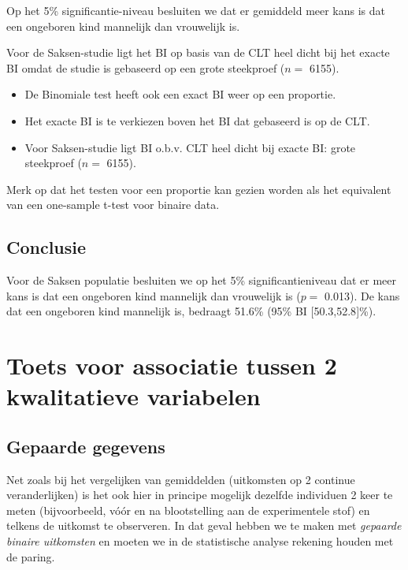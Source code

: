 \documentclass[
  12pt,dutch,coursenotes]{book}
\theoremstyle{definition}
\theoremstyle{definition}
\theoremstyle{definition}
\theoremstyle{definition}
\theoremstyle{remark}
\begin{document}
Op het 5\% significantie-niveau besluiten we dat er gemiddeld meer kans is dat een ongeboren kind mannelijk dan vrouwelijk is.

Voor de Saksen-studie ligt het BI op basis van de CLT heel dicht bij het exacte BI omdat de studie is gebaseerd op een grote steekproef (\(n=\) 6155).

\begin{itemize}
\item
  De Binomiale test heeft ook een exact BI weer op een proportie.
\item
  Het exacte BI is te verkiezen boven het BI dat gebaseerd is op de CLT.
\item
  Voor Saksen-studie ligt BI o.b.v. CLT heel dicht bij exacte BI: grote steekproef (\(n=\) 6155).
\end{itemize}

Merk op dat het testen voor een proportie kan gezien worden als het equivalent van een one-sample t-test voor binaire data.

\hypertarget{conclusie}{%
\subsection{Conclusie}\label{conclusie}}

Voor de Saksen populatie besluiten we op het 5\% significantieniveau dat er meer kans is dat een ongeboren kind mannelijk dan vrouwelijk is (\(p=\) 0.013).
De kans dat een ongeboren kind mannelijk is, bedraagt 51.6\% (95\% BI {[}50.3,52.8{]}\%).

\hypertarget{toets-voor-associatie-tussen-2-kwalitatieve-variabelen}{%
\section{Toets voor associatie tussen 2 kwalitatieve variabelen}\label{toets-voor-associatie-tussen-2-kwalitatieve-variabelen}}

\hypertarget{gepaarde-gegevens}{%
\subsection{Gepaarde gegevens}\label{gepaarde-gegevens}}

Net zoals bij het vergelijken van
gemiddelden (uitkomsten op 2 continue veranderlijken) is het ook hier in
principe mogelijk dezelfde individuen 2 keer te meten (bijvoorbeeld,
vóór en na blootstelling aan de experimentele stof) en telkens de
uitkomst te observeren. In dat geval hebben we te maken met \emph{gepaarde
binaire uitkomsten} en moeten we in de statistische analyse rekening houden
met de paring.
\end{document}
